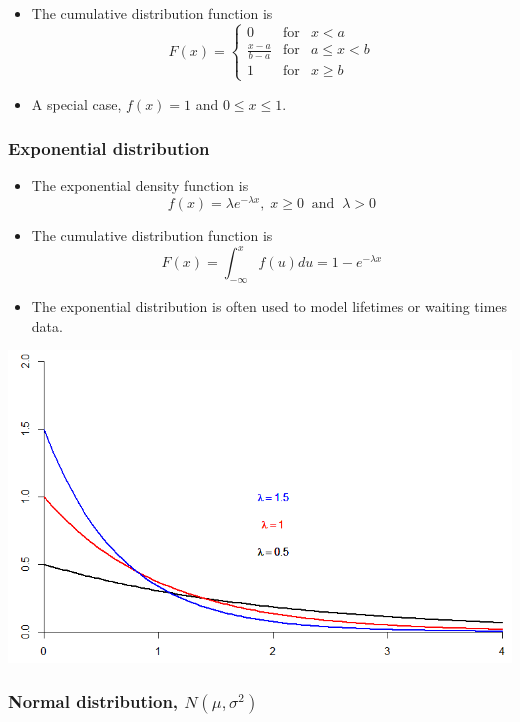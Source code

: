 \documentclass[
]{article}
\providecommand{\tightlist}{%
  \setlength{\itemsep}{0pt}\setlength{\parskip}{0pt}}
\begin{document}
\begin{itemize}
\item
  The cumulative distribution function is
  \[F(x)=\left\{\begin{array}{lll}0& \text{for}& x<a\\
  \frac{x-a}{b-a}& \text{for}& a\leq x <b \\
  1&\text{for}& x \geq b\end{array}\right.\]
\item
  A special case, \(f (x) = 1\) and \(0 \leq x \leq 1\).
\end{itemize}

\hypertarget{exponential-distribution}{%
\subsubsection{Exponential
distribution}\label{exponential-distribution}}

\begin{itemize}
\tightlist
\item
  The exponential density function is
  \[f(x)=\lambda e^{-\lambda x},\; x \geq 0  \;\;\text{and}\;\; \lambda >0\]
\item
  The cumulative distribution function is
  \[F(x)=\int_{-\infty}^x f(u)du =1-e^{-\lambda x}
  \]
\item
  The exponential distribution is often used to model lifetimes or
  waiting times data.
\end{itemize}

\begin{center}\includegraphics[width=1\linewidth,height=1\textheight]{expdist} \end{center}

\hypertarget{normal-distribution-nmusigma2}{%
\subsubsection{\texorpdfstring{Normal distribution,
\(N(\mu,\sigma^2)\)}{Normal distribution, N(\textbackslash mu,\textbackslash sigma\^{}2)}}\label{normal-distribution-nmusigma2}}
\end{document}

